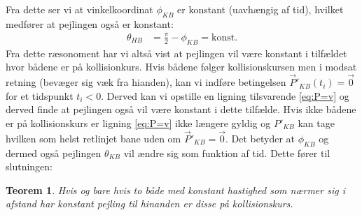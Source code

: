 \documentclass[%
 reprint,
nofootinbib,
aps,
]{revtex4-1}
\newtheorem{theorem}{Teorem}
\begin{document}
Fra dette ser vi at vinkelkoordinat $\phi_{KB}$ er konstant (uavhængig af tid), hvilket medfører at pejlingen også er konstant:
\begin{align*}
  \theta_{HB} &= \frac{\pi}{2} - \phi_{KB} = \text{konst.}
\end{align*}
Fra dette ræsonoment har vi altså vist at pejlingen vil være konstant i tilfældet hvor bådene er på kollisionkurs. Hvis bådene følger kollisionskursen men i modsat retning (bevæger sig væk fra hianden), kan vi indføre betingelsen $\vec{P}'_{KB}(t_i) = \vec{0}$ for et tidspunkt $t_i < 0$. Derved kan vi opstille en ligning tilsvarende \ref{eq:P=v} og derved finde at pejlingen også vil være konstant i dette tilfælde. Hvis ikke bådene er på kollisionskurs er ligning \ref{eq:P=v} ikke længere gyldig og $P'_{KB}$ kan tage hvilken som helst retlinjet bane uden om $\vec{P}'_{KB} = \vec{0}$. Det betyder at $\phi_{KB}$ og dermed også pejlingen $\theta_{KB}$ vil ændre sig som funktion af tid. Dette fører til slutningen:
\begin{theorem}
  Hvis og bare hvis to både med konstant hastighed som nærmer sig i afstand har konstant pejling til hinanden er disse på kollisionskurs.
  \label{Teo:pejling}
\end{theorem}
\end{document}
